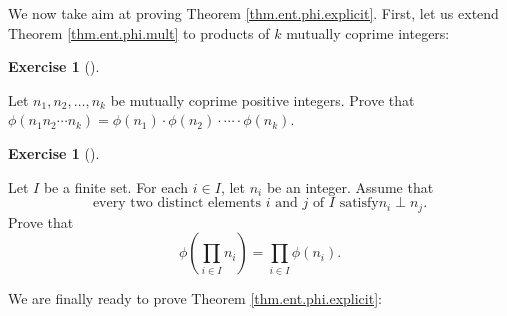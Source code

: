 \documentclass[numbers=enddot,12pt,final,onecolumn,notitlepage]{scrartcl}%
\newcounter{exer}
\numberwithin{exer}{subsection}
\theoremstyle{definition}
\newtheorem{exmp}[exer]{Exercise}
\newenvironment{exercise}[1][]
{\begin{exmp}[#1]\begin{leftbar}}
{\end{leftbar}\end{exmp}}
\let\prodnonlimits\prod
\renewcommand{\prod}{\prodnonlimits\limits}
\begin{document}
We now take aim at proving Theorem \ref{thm.ent.phi.explicit}. First, let us
extend Theorem \ref{thm.ent.phi.mult} to products of $k$ mutually coprime integers:

\begin{exercise}
\label{exe.ent.phi.multk.1}Let $n_{1},n_{2},\ldots,n_{k}$ be mutually coprime
positive integers. Prove that $\phi\left(  n_{1}n_{2}\cdots n_{k}\right)
=\phi\left(  n_{1}\right)  \cdot\phi\left(  n_{2}\right)  \cdot\cdots\cdot
\phi\left(  n_{k}\right)  $.
\end{exercise}

\begin{exercise}
\label{exe.ent.phi.multk.2}Let $I$ be a finite set. For each $i\in I$, let
$n_{i}$ be an integer. Assume that%
\begin{equation}
\text{every two distinct elements }i\text{ and }j\text{ of }I\text{ satisfy
}n_{i}\perp n_{j}. \label{eq.exe.ent.phi.multk.2.ass}%
\end{equation}
Prove that
\[
\phi\left(  \prod_{i\in I}n_{i}\right)  =\prod_{i\in I}\phi\left(
n_{i}\right)  .
\]

\end{exercise}

We are finally ready to prove Theorem \ref{thm.ent.phi.explicit}:
\end{document}
